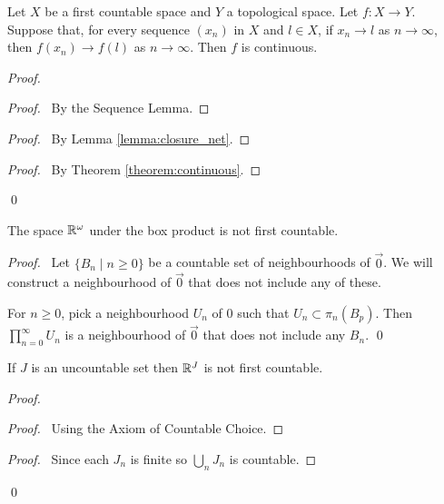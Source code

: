 \begin{theorem}[CC]
    Let $X$ be a first countable space and $Y$ a topological space. Let $f : X \rightarrow Y$. Suppose that, for every sequence $(x_n)$ in $X$ and $l \in X$, if $x_n \rightarrow l$
    as $n \rightarrow \infty$, then $f(x_n) \rightarrow f(l)$ as $n \rightarrow \infty$. Then $f$ is continuous.
\end{theorem}

\begin{proof}
    \pf
    \begin{proof}
        \pf\ By the Sequence Lemma.
    \end{proof}
    \begin{proof}
        \pf\ By Lemma \ref{lemma:closure_net}.
    \end{proof}
    \qedstep
    \begin{proof}
        \pf\ By Theorem \ref{theorem:continuous}.
    \end{proof}
    \qed
\end{proof}

\begin{example}[CC]
    The space $\mathbb{R}^\omega$ under the box product is not first countable.
\end{example}

\begin{proof}
    \pf\ Let $\{ B_n \mid n \geq 0 \}$ be a countable set of neighbourhoods of $\vec{0}$. We will construct a neighbourhood of $\vec{0}$ that does not include any of these.

    For $n \geq 0$, pick a neighbourhood $U_n$ of 0 such that $U_n \subset \pi_n(B_p)$. Then $\prod_{n=0}^\infty U_n$ is a neighbourhood of $\vec{0}$ that does not
    include any $B_n$. \qed
\end{proof}

\begin{example}
    If $J$ is an uncountable set then $\mathbb{R}^J$ is not first countable.
\end{example}

\begin{proof}
    \pf
    \begin{proof}
        \pf\ Using the Axiom of Countable Choice.
    \end{proof}
    \begin{proof}
        \pf\ Since each $J_n$ is finite so $\bigcup_n J_n$ is countable.
    \end{proof}
    \qed
\end{proof}

